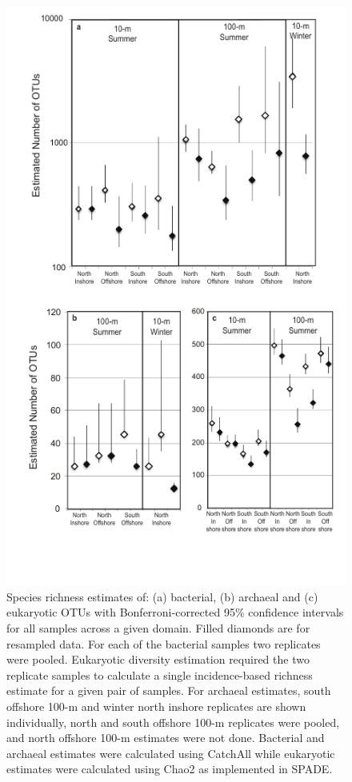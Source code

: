 \begin{figure}
	[htbp] \centering 
	\includegraphics[width=0.7
	\textwidth]{Chapter_2_MIRADA/Figures/Figure_6_PAL_alpha_comp_75mm} 
	\caption[Estimated OTU richness for Bacteria, Archaea, and Eukarya at different sites.]{Species richness estimates of: (a) bacterial, (b) archaeal and (c) eukaryotic OTUs with Bonferroni-corrected 95\% confidence intervals for all samples across a given domain. Filled diamonds are for resampled data. For each of the bacterial samples two replicates were pooled. Eukaryotic diversity estimation required the two replicate samples to calculate a single incidence-based richness estimate for a given pair of samples. For archaeal estimates, south offshore 100-m and winter north inshore replicates are shown individually, north and south offshore 100-m replicates were pooled, and north offshore 100-m estimates were not done. Bacterial and archaeal estimates were calculated using CatchAll while eukaryotic estimates were calculated using Chao2 as implemented in SPADE.} \label{fig:richness1} 
\end{figure}

